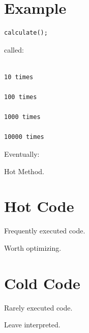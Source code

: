 \documentclass[11pt,a4paper]{book}
\begin{document}
\section{Example}

\begin{verbatim} 
calculate();
\end{verbatim}

called:

\begin{verbatim}

10 times

100 times

1000 times

10000 times

\end{verbatim}


Eventually:


Hot Method.


\section{Hot Code}

Frequently executed code.


Worth optimizing.


\section{Cold Code}

Rarely executed code.


Leave interpreted.


\end{document}
